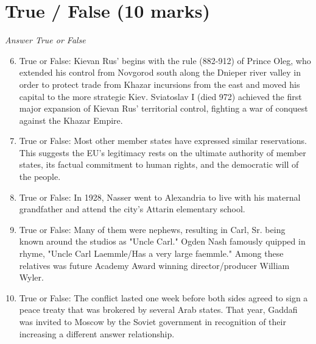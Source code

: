 \documentclass[12pt]{article}
\begin{document}
\section*{True / False (10 marks)}
\textit{Answer True or False}
\begin{enumerate}[label=\arabic*.]
\setcounter{enumi}{5}
\item True or False: Kievan Rus' begins with the rule (882-912) of Prince Oleg, who extended his control from Novgorod south along the Dnieper river valley in order to protect trade from Khazar incursions from the east and moved his capital to the more strategic Kiev. Sviatoslav I (died 972) achieved the first major expansion of Kievan Rus' territorial control, fighting a war of conquest against the Khazar Empire.
\item True or False: Most other member states have expressed similar reservations. This suggests the EU's legitimacy rests on the ultimate authority of member states, its factual commitment to human rights, and the democratic will of the people.
\item True or False: In 1928, Nasser went to Alexandria to live with his maternal grandfather and attend the city's Attarin elementary school.
\item True or False: Many of them were nephews, resulting in Carl, Sr. being known around the studios as "Uncle Carl." Ogden Nash famously quipped in rhyme, "Uncle Carl Laemmle/Has a very large faemmle." Among these relatives was future Academy Award winning director/producer William Wyler.
\item True or False: The conflict lasted one week before both sides agreed to sign a peace treaty that was brokered by several Arab states. That year, Gaddafi was invited to Moscow by the Soviet government in recognition of their increasing a different answer relationship.
\end{enumerate}
\end{document}
